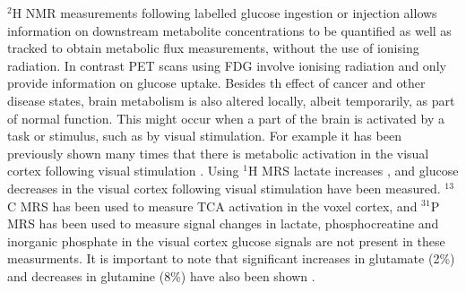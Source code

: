 $^2$H \ac{NMR} measurements following labelled glucose ingestion or injection allows information on downstream metabolite concentrations to be quantified as well as tracked to obtain metabolic flux measurements, without the use of ionising radiation. In contrast \ac{PET} scans using \ac{FDG}  involve ionising radiation and only provide information on glucose uptake. Besides th effect of cancer and other disease states, brain metabolism is also altered locally, albeit temporarily, as part of normal function. This might occur when a part of the brain is activated by a task or stimulus, such as by visual stimulation. For example it has been previously shown many times that there is metabolic activation in the visual cortex following visual stimulation \cite{Kushner1988CerebralStimulation, Beland-Millar2018FluctuationsStimulation}. Using $^1$H \ac{MRS} lactate increases \cite{Prichard1991LactateStimulation., Sappey-Marinier1992EffectSpectroscopy, Fernandes2020MeasurementT}, and glucose decreases \cite{Lin2012InvestigatingT} in the visual cortex following visual stimulation have been measured. $^{13}$C \cite{Chhina2001MeasurementSpectroscopy} \ac{MRS} has been used to measure TCA activation in the voxel cortex, and $^{31}$P \ac{MRS} has been used to measure signal changes in lactate, phosphocreatine and inorganic phosphate in the visual cortex \cite{Sappey-Marinier1992EffectSpectroscopy} glucose signals are not present in these measurments. It is important to note that significant increases in glutamate (2\%) and decreases in glutamine (8\%) have also been shown \cite{Lin2012InvestigatingT}.
 
